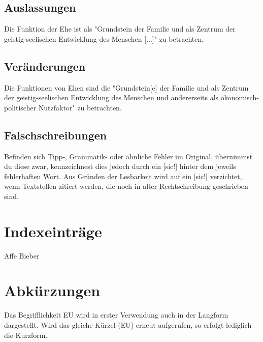 \subsection{Auslassungen}
Die Funktion der Ehe ist als "Grundstein der Familie und als Zentrum der
geistig-seelischen Entwicklung des Menschen [...]"
\autocite[9]{aristotle:physics} zu betrachten.                                      %

\subsection{Ver\"anderungen}
Die Funktionen von Ehen sind die "Grundstein[e] der Familie und als Zentrum
der geistig-seelischen Entwicklung des Menschen und andererseits als
\"okonomisch-politischer Nutzfaktor" \autocite[9]{aristotle:physics} zu betrachten. %

\subsection{Falschschreibungen}
Befinden sich Tipp-, Grammatik- oder \"ahnliche Fehler im Original,
\"ubernimmst du diese zwar, kennzeichnest dies jedoch durch ein [sic!]
hinter dem jeweils fehlerhaften Wort. Aus Gr\"unden der Lesbarkeit
wird auf ein [sic!] verzichtet, wenn Textstellen zitiert werden,
die noch in alter Rechtschreibung geschrieben sind.                                 %

\section{Indexeintr\"age}
Affe
Bieber                                                                %


\section{Abk\"urzungen}                                                             
Das Begrifflichkeit \ac{EU} wird in erster Verwendung auch in der Langform
dargestellt. Wird das gleiche K\"urzel (\ac{EU}) erneut aufgerufen,
so erfolgt lediglich die Kurzform.                                                  %

\newpage

